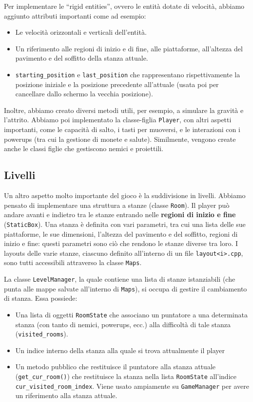 \documentclass[a4paper,12pt]{article}
\begin{document}
Per implementare le “rigid entities”, ovvero le entità dotate di velocità, abbiamo aggiunto attributi importanti come ad esempio:
\begin{itemize}
\item Le velocità orizzontali e verticali dell’entità.
\item Un riferimento alle regioni di inizio e di fine, alle piattaforme, all’altezza del pavimento e del soffitto della stanza attuale.
\item \texttt{starting\_position} e \texttt{last\_position} che rappresentano rispettivamente la posizione iniziale e la posizione precedente all'attuale (usata poi per cancellare dallo schermo la vecchia posizione).
\end{itemize}

Inoltre, abbiamo creato diversi metodi utili, per esempio, a simulare la gravità e l’attrito.
Abbiamo poi implementato la classe-figlia \texttt{Player}, con altri aspetti importanti, come le capacità di salto, i tasti per muoversi, e le interazioni con i powerups (tra cui la gestione di monete e salute).
Similmente, vengono create anche le classi figlie che gestiscono nemici e proiettili.

\subsection{Livelli}
Un altro aspetto molto importante del gioco è la suddivisione in livelli. Abbiamo pensato di implementare una struttura a stanze (classe \texttt{Room}). Il player può andare avanti e indietro tra le stanze entrando nelle \textbf{regioni di inizio e fine} (\texttt{StaticBox}). Una stanza è definita con vari parametri, tra cui una lista delle sue piattaforme, le sue dimensioni, l’altezza del pavimento e del soffitto, regioni di inizio e fine: questi parametri sono ciò che rendono le stanze diverse tra loro.
I layouts delle varie stanze, ciascuno definito all'interno di un file \texttt{layout<i>.cpp}, sono tutti accessibili attraverso la classe \texttt{Maps}.

La classe \texttt{LevelManager}, la quale contiene una lista di stanze istanziabili (che punta alle mappe salvate all'interno di \texttt{Maps}), si occupa di gestire il cambiamento di stanza. Essa possiede: 
\begin{itemize}
\item Una lista di oggetti \texttt{RoomState} che associano un puntatore a una determinata stanza (con tanto di nemici, powerups, ecc.) alla difficoltà di tale stanza (\texttt{visited\_rooms}).
\item Un indice interno della stanza alla quale si trova attualmente il player 
\item Un metodo pubblico che restituisce il puntatore alla stanza attuale (\texttt{get\_cur\_room()}) che restituisce la stanza nella lista \texttt{RoomState} all’indice \texttt{cur\_visited\_room\_index}. Viene usato ampiamente su \texttt{GameManager} per avere un riferimento alla stanza attuale.
\end{itemize} 
\end{document}
